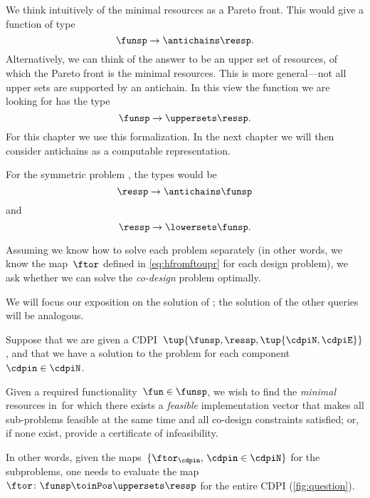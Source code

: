 We think intuitively of the minimal resources as a Pareto front. This would give a function of type
\begin{equation}
    \funsp \to \antichains\ressp.
\end{equation}
Alternatively, we can think of the answer to be an upper set of resources, of which the Pareto front is the minimal resources. This is more general---not all upper sets are supported by an antichain. In this view the function we are looking for has the type
\begin{equation}
    \funsp \to \uppersets\ressp.
\end{equation}
For this chapter we use this formalization. In the next chapter we will then consider antichains as a computable representation.

For the symmetric problem \FixResMaxFun, the types would be
\begin{equation}
    \ressp \to \antichains\funsp
\end{equation}
and
\begin{equation}
    \ressp \to \lowersets\funsp.
\end{equation}


Assuming we know how to solve each problem separately (in other words, we know the map~$\ftor$ defined in \cref{eq:hfromftoupr} for each design problem), we ask whether we can solve the \emph{co-design} problem optimally.

We will focus our exposition on the solution of \FixFunMinRes; the solution of the other queries will be analogous.


\begin{problem}
    \label{prob:MCDP}
    Suppose that we are given a CDPI~$\tup{ \funsp,\ressp,\tup{ \cdpiN,\cdpiE} }$, and that we have a solution to the \FixFunMinRes problem for each component~$\cdpin\in\cdpiN$.
    
    Given a required functionality~$\fun\in\funsp$, we wish to find the \emph{minimal} resources in~\ressp for which there exists a \emph{feasible} implementation vector that makes all sub-problems feasible at the same time and all co-design constraints satisfied; or, if none exist, provide a certificate of infeasibility.
\end{problem}
In other words, given the maps~$\{\ftor_{\cdpin},\,\cdpin\in\cdpiN\}$ for the subproblems, one needs to evaluate  the map~$\ftor\colon\funsp \toinPos \uppersets \ressp$ for the entire CDPI (\cref{fig:question}).


